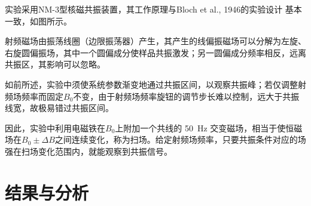 \documentclass[aps,pre,12pt,preprint,%
	onecolumn,showpacs,showkeys,nofootinbib]{revtex4-1}
\begin{document}
	实验采用NM-3型核磁共振装置，其工作原理与Bloch et al., 1946的实验设计 \cite{PhysRev.70.474} 基本一致，如图所示。
	
	射频磁场由振荡线圈（边限振荡器）产生，其产生的线偏振磁场可以分解为左旋、右旋圆偏振场，其中一个圆偏成分使样品共振激发；另一圆偏成分频率相反，远离共振区，其影响可以忽略。
\clearpage
	
	如前所述，实验中须使系统参数渐变地通过共振区间，以观察共振峰；若仅调整射频场频率而固定$B_0$不变，由于射频场频率旋钮的调节步长难以控制，远大于共振线宽，故极易错过共振区间。
	
	因此，实验中利用电磁铁在$B_0$上附加一个共线的 \SI{50}{\Hz} 交变磁场，相当于使恒磁场在$B_0 \pm\Delta B$之间连续变化，称为扫场。给定射频场频率，只要共振条件对应的场强在扫场变化范围内，就能观察到共振信号。
\section{结果与分析}
%
%
\end{document}
